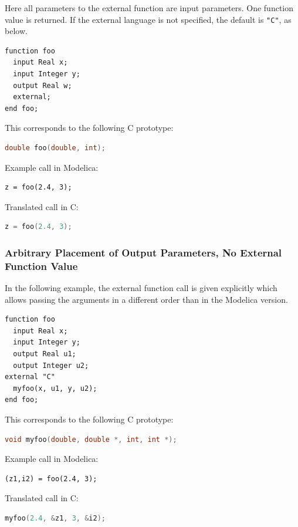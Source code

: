 \begin{example}
Here all parameters to the external function are input parameters.
One function value is returned.
If the external language is not specified, the default is {\lstinline!"C"!}, as below.
\begin{lstlisting}[language=modelica]
function foo
  input Real x;
  input Integer y;
  output Real w;
  external;
end foo;
\end{lstlisting}
This corresponds to the following C prototype:
\begin{lstlisting}[language=C]
double foo(double, int);
\end{lstlisting}

Example call in Modelica:
\begin{lstlisting}[language=modelica]
z = foo(2.4, 3);
\end{lstlisting}
Translated call in C:
\begin{lstlisting}[language=C]
z = foo(2.4, 3);
\end{lstlisting}
\end{example}

\subsubsection{Arbitrary Placement of Output Parameters, No External Function Value}\label{arbitrary-placement-of-output-parameters-no-external-function-value}

\begin{example}
In the following example, the external function call is given explicitly which allows passing the arguments in a different order than in the Modelica version.
\begin{lstlisting}[language=modelica]
function foo
  input Real x;
  input Integer y;
  output Real u1;
  output Integer u2;
external "C"
  myfoo(x, u1, y, u2);
end foo;
\end{lstlisting}
This corresponds to the following C prototype:
\begin{lstlisting}[language=C]
void myfoo(double, double *, int, int *);
\end{lstlisting}
Example call in Modelica:
\begin{lstlisting}[language=modelica]
(z1,i2) = foo(2.4, 3);
\end{lstlisting}
Translated call in C:
\begin{lstlisting}[language=C]
myfoo(2.4, &z1, 3, &i2);
\end{lstlisting}
\end{example}

